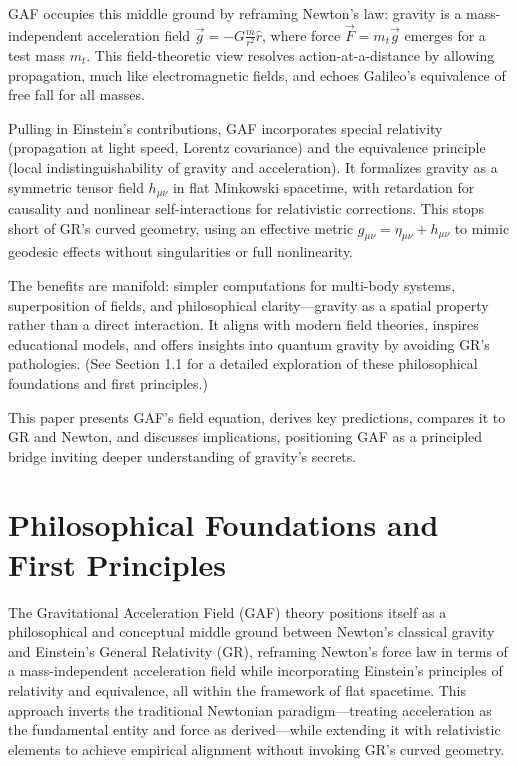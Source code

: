 \documentclass{article}
\begin{document}
GAF occupies this middle ground by reframing Newton's law: gravity is a mass-independent acceleration field \( \vec{g} = -G \frac{m}{r^2} \hat{r} \), where force \( \vec{F} = m_t \vec{g} \) emerges for a test mass \( m_t \). This field-theoretic view resolves action-at-a-distance by allowing propagation, much like electromagnetic fields, and echoes Galileo's equivalence of free fall for all masses.

Pulling in Einstein's contributions, GAF incorporates special relativity (propagation at light speed, Lorentz covariance) and the equivalence principle (local indistinguishability of gravity and acceleration). It formalizes gravity as a symmetric tensor field \( h_{\mu\nu} \) in flat Minkowski spacetime, with retardation for causality and nonlinear self-interactions for relativistic corrections. This stops short of GR's curved geometry, using an effective metric \( g_{\mu\nu} = \eta_{\mu\nu} + h_{\mu\nu} \) to mimic geodesic effects without singularities or full nonlinearity.

The benefits are manifold: simpler computations for multi-body systems, superposition of fields, and philosophical clarity—gravity as a spatial property rather than a direct interaction. It aligns with modern field theories, inspires educational models, and offers insights into quantum gravity by avoiding GR's pathologies. (See Section 1.1 for a detailed exploration of these philosophical foundations and first principles.)

This paper presents GAF's field equation, derives key predictions, compares it to GR and Newton, and discusses implications, positioning GAF as a principled bridge inviting deeper understanding of gravity's secrets.

\section{Philosophical Foundations and First Principles}

The Gravitational Acceleration Field (GAF) theory positions itself as a philosophical and conceptual middle ground between Newton's classical gravity and Einstein's General Relativity (GR), reframing Newton's force law in terms of a mass-independent acceleration field while incorporating Einstein's principles of relativity and equivalence, all within the framework of flat spacetime. This approach inverts the traditional Newtonian paradigm—treating acceleration as the fundamental entity and force as derived—while extending it with relativistic elements to achieve empirical alignment without invoking GR's curved geometry.
\end{document}
